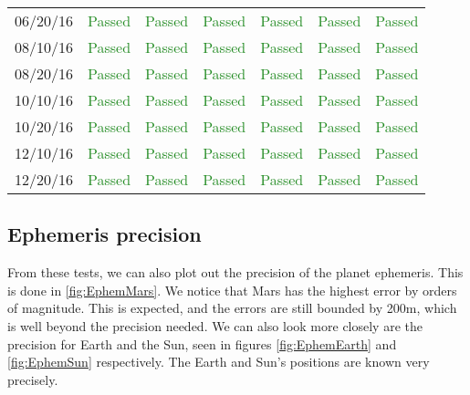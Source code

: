 \documentclass[]{BasiliskReportMemo}
\begin{document}
\begin{table}[htbp]
\begin{tabular}{c | c | c | c | c | c | c}
      06/20/16 & \textcolor{ForestGreen}{Passed} & \textcolor{ForestGreen}{Passed} &  \textcolor{ForestGreen}{Passed}&  \textcolor{ForestGreen}{Passed} & \textcolor{ForestGreen}{Passed} &  \textcolor{ForestGreen}{Passed}\\
      08/10/16 & \textcolor{ForestGreen}{Passed} & \textcolor{ForestGreen}{Passed} &  \textcolor{ForestGreen}{Passed}&  \textcolor{ForestGreen}{Passed} & \textcolor{ForestGreen}{Passed} &  \textcolor{ForestGreen}{Passed}\\
      08/20/16 & \textcolor{ForestGreen}{Passed} & \textcolor{ForestGreen}{Passed} &  \textcolor{ForestGreen}{Passed}&  \textcolor{ForestGreen}{Passed} & \textcolor{ForestGreen}{Passed} &  \textcolor{ForestGreen}{Passed}\\
      10/10/16 & \textcolor{ForestGreen}{Passed} & \textcolor{ForestGreen}{Passed} &  \textcolor{ForestGreen}{Passed}&  \textcolor{ForestGreen}{Passed} & \textcolor{ForestGreen}{Passed} &  \textcolor{ForestGreen}{Passed}\\
      10/20/16 & \textcolor{ForestGreen}{Passed} & \textcolor{ForestGreen}{Passed} &  \textcolor{ForestGreen}{Passed}&  \textcolor{ForestGreen}{Passed} & \textcolor{ForestGreen}{Passed} &  \textcolor{ForestGreen}{Passed}\\
      12/10/16 & \textcolor{ForestGreen}{Passed} & \textcolor{ForestGreen}{Passed} &  \textcolor{ForestGreen}{Passed}&  \textcolor{ForestGreen}{Passed} & \textcolor{ForestGreen}{Passed} &  \textcolor{ForestGreen}{Passed}\\
      12/20/16 & \textcolor{ForestGreen}{Passed} & \textcolor{ForestGreen}{Passed} &  \textcolor{ForestGreen}{Passed}&  \textcolor{ForestGreen}{Passed} & \textcolor{ForestGreen}{Passed} &  \textcolor{ForestGreen}{Passed}\\
      \hline
   \end{tabular}
\end{table}


\subsection{Ephemeris precision}

From these tests, we can also plot out the precision of the planet ephemeris. This is done in \ref{fig:EphemMars}. We notice that Mars has the highest error by orders of magnitude. This is expected, and the errors are still bounded by 200m, which is well beyond the precision needed. We can also look more closely are the precision for Earth and the Sun, seen in figures  \ref{fig:EphemEarth} and  \ref{fig:EphemSun} respectively. The Earth and Sun's positions are known very precisely. 







\end{document}
